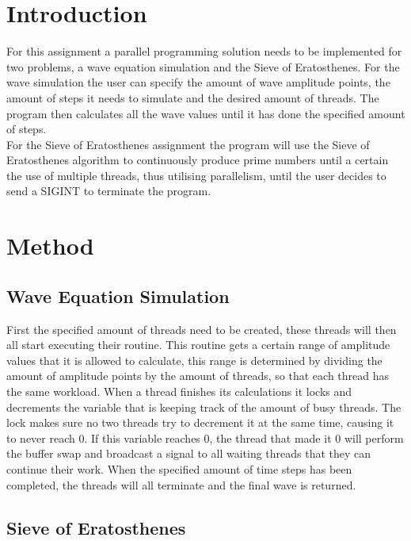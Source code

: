 \documentclass[a4paper,12px]{article}
\begin{document}
\tableofcontents
\clearpage


\section{Introduction}

For this assignment a parallel programming solution needs to be implemented for
two problems, a wave equation simulation and the Sieve of Eratosthenes. For the
wave simulation the user can specify the amount of wave amplitude points, the
amount of steps it needs to simulate and the desired amount of threads. The
program then calculates all the wave values until it has done the specified
amount of steps.\\
For the Sieve of Eratosthenes assignment the program will use the Sieve of Eratosthenes
algorithm to continuously produce prime numbers until a certain
the use of multiple threads, thus utilising parallelism, until the user decides
to send a SIGINT to terminate the program.

\section{Method}
\subsection{Wave Equation Simulation}

First the specified amount of threads need to be created, these threads will
then all start executing their routine. This routine gets a certain range of
amplitude values that it is allowed to calculate, this range is determined by
dividing the amount of amplitude points by the amount of threads, so that each
thread has the same workload. When a thread finishes its calculations it locks
and decrements the variable that is keeping track of the amount of busy threads.
The lock makes sure no two threads try to decrement it at the same time, causing
it to never reach 0.  If this variable reaches 0, the thread that made it 0 will
perform the buffer swap and broadcast a signal to all waiting threads that they
can continue their work. When the specified amount of time steps has been
completed, the threads will all terminate and the final wave is returned.

\subsection{Sieve of Eratosthenes}
\end{document}
